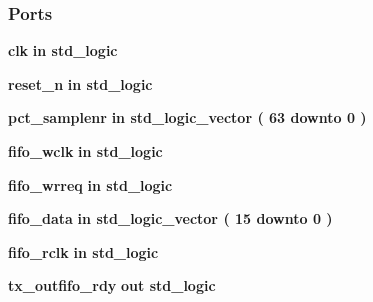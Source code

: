 \subsubsection*{Ports}
 \begin{DoxyCompactItemize}
\item 
{\bf clk}  {\bfseries {\bfseries \textcolor{keywordflow}{in}\textcolor{vhdlchar}{ }}} {\bfseries \textcolor{comment}{std\+\_\+logic}\textcolor{vhdlchar}{ }} 
\item 
{\bf reset\+\_\+n}  {\bfseries {\bfseries \textcolor{keywordflow}{in}\textcolor{vhdlchar}{ }}} {\bfseries \textcolor{comment}{std\+\_\+logic}\textcolor{vhdlchar}{ }} 
\item 
{\bf pct\+\_\+samplenr}  {\bfseries {\bfseries \textcolor{keywordflow}{in}\textcolor{vhdlchar}{ }}} {\bfseries \textcolor{comment}{std\+\_\+logic\+\_\+vector}\textcolor{vhdlchar}{ }\textcolor{vhdlchar}{(}\textcolor{vhdlchar}{ }\textcolor{vhdlchar}{ } \textcolor{vhdldigit}{63} \textcolor{vhdlchar}{ }\textcolor{keywordflow}{downto}\textcolor{vhdlchar}{ }\textcolor{vhdlchar}{ } \textcolor{vhdldigit}{0} \textcolor{vhdlchar}{ }\textcolor{vhdlchar}{)}\textcolor{vhdlchar}{ }} 
\item 
{\bf fifo\+\_\+wclk}  {\bfseries {\bfseries \textcolor{keywordflow}{in}\textcolor{vhdlchar}{ }}} {\bfseries \textcolor{comment}{std\+\_\+logic}\textcolor{vhdlchar}{ }} 
\item 
{\bf fifo\+\_\+wrreq}  {\bfseries {\bfseries \textcolor{keywordflow}{in}\textcolor{vhdlchar}{ }}} {\bfseries \textcolor{comment}{std\+\_\+logic}\textcolor{vhdlchar}{ }} 
\item 
{\bf fifo\+\_\+data}  {\bfseries {\bfseries \textcolor{keywordflow}{in}\textcolor{vhdlchar}{ }}} {\bfseries \textcolor{comment}{std\+\_\+logic\+\_\+vector}\textcolor{vhdlchar}{ }\textcolor{vhdlchar}{(}\textcolor{vhdlchar}{ }\textcolor{vhdlchar}{ } \textcolor{vhdldigit}{15} \textcolor{vhdlchar}{ }\textcolor{keywordflow}{downto}\textcolor{vhdlchar}{ }\textcolor{vhdlchar}{ } \textcolor{vhdldigit}{0} \textcolor{vhdlchar}{ }\textcolor{vhdlchar}{)}\textcolor{vhdlchar}{ }} 
\item 
{\bf fifo\+\_\+rclk}  {\bfseries {\bfseries \textcolor{keywordflow}{in}\textcolor{vhdlchar}{ }}} {\bfseries \textcolor{comment}{std\+\_\+logic}\textcolor{vhdlchar}{ }} 
\item 
{\bf tx\+\_\+outfifo\+\_\+rdy}  {\bfseries {\bfseries \textcolor{keywordflow}{out}\textcolor{vhdlchar}{ }}} {\bfseries \textcolor{comment}{std\+\_\+logic}\textcolor{vhdlchar}{ }} 
\item 

\end{DoxyCompactItemize}
